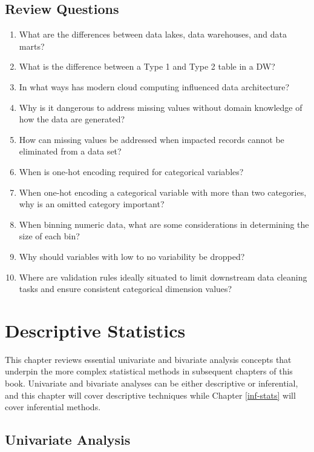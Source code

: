 \documentclass[
]{book}
\begin{document}
\hypertarget{review-questions-4}{%
\section{Review Questions}\label{review-questions-4}}

\begin{enumerate}
\def\labelenumi{\arabic{enumi}.}
\item
  What are the differences between data lakes, data warehouses, and data marts?
\item
  What is the difference between a Type 1 and Type 2 table in a DW?
\item
  In what ways has modern cloud computing influenced data architecture?
\item
  Why is it dangerous to address missing values without domain knowledge of how the data are generated?
\item
  How can missing values be addressed when impacted records cannot be eliminated from a data set?
\item
  When is one-hot encoding required for categorical variables?
\item
  When one-hot encoding a categorical variable with more than two categories, why is an omitted category important?
\item
  When binning numeric data, what are some considerations in determining the size of each bin?
\item
  Why should variables with low to no variability be dropped?
\item
  Where are validation rules ideally situated to limit downstream data cleaning tasks and ensure consistent categorical dimension values?
\end{enumerate}

\hypertarget{desc-stats}{%
\chapter{Descriptive Statistics}\label{desc-stats}}

This chapter reviews essential univariate and bivariate analysis concepts that underpin the more complex statistical methods in subsequent chapters of this book. Univariate and bivariate analyses can be either descriptive or inferential, and this chapter will cover descriptive techniques while Chapter \ref{inf-stats} will cover inferential methods.

\hypertarget{univariate-analysis}{%
\section{Univariate Analysis}\label{univariate-analysis}}
\end{document}
